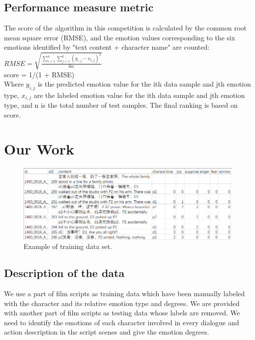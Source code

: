 \documentclass[12pt,twocolumn,letterpaper]{article}
\begin{document}
\subsection{Performance measure metric}

The score of the algorithm in this competition is calculated by the common root mean square error (RMSE), and the emotion values corresponding to the six emotions identified by "text content + character name" are counted:\\

$R M S E=\sqrt{\frac{\sum_{i=1}^{n} \sum_{j=1}^{6}\left(y_{i, j}-x_{i, j}\right)^{2}}{6 n}}$\\

score = 1/(1 + RMSE)\\

Where $y_{i,j}$ is the predicted emotion value for the ith data sample and jth emotion type, $x_{i,j}$ are the labeled emotion value for the ith data sample and jth emotion type, and n is the total number of test samples.  
The final ranking is based on score.  

\section{Our Work}
\begin{figure}
\begin{center}
\includegraphics[scale=0.8]{data_sample.png}
\end{center}
   \caption{Example of training data set.}
\label{fig:short}
\end{figure}
\subsection{Description of the data}
 We use a part of film scripts as training data which have been manually labeled with the character and its relative emotion type and degrees. We are provided with another part of film scripts as testing data whose labels are removed. We need to identify the emotions of each character involved in every dialogue and action description in the script scenes and give the emotion degrees.
\end{document}
